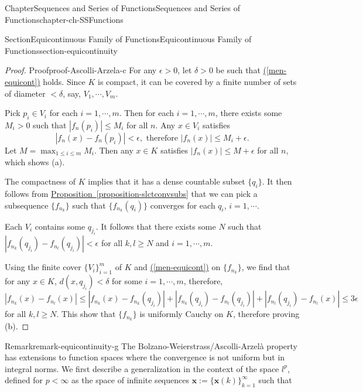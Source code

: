 \documentclass[oneside,10pt,]{book}
\newcommand{\xreffont}{\relax}
\numberwithin{equation}{section}
\begin{document}
\begin{chapterptx}{Chapter}{Sequences and Series of Functions}{}{Sequences and Series of Functions}{}{}{chapter-ch-SSFunctions}
\begin{sectionptx}{Section}{Equicontinuous Family of Functions}{}{Equicontinuous Family of Functions}{}{}{section-equicontinuity}
\begin{proof}{Proof}{}{proof-Ascolli-Arzela-c}
For any \(\epsilon > 0\), let \(\delta > 0\) be such that \hyperref[men-equicont]{({\xreffont\ref{men-equicont}})} holds. Since \(K\) is compact, it can be covered by a finite number of sets of diameter \(< \delta\), say, \(V_{1}, \cdots, V_{m}\).%
\par
Pick \(p_{i} \in V_{i}\) for each \(i=1,\cdots, m\). Then for each \(i=1,\cdots,m\), there exists some \(M_{i} > 0\) such that \(|f_{n}(p_{i})|\le M_{i}\) for all \(n\). Any \(x\in V_{i}\) satisfies%
\begin{equation*}
|f_{n}(x)-f_{n}(p_{i})| < \epsilon, \text{ therefore } |f_{n}(x)|\le M_{i}+\epsilon.
\end{equation*}
Let \(M=\max_{1\le i\le m}M_{i}\). Then any \(x\in K\) satisfies \(|f_{n}(x)|\le M+\epsilon\) for all \(n\), which shows (a).%
\par
The compactness of \(K\) implies that it has a dense countable subset \(\{q_{i}\}\). It then follows from \hyperref[proposition-slctconvsubs]{Proposition~{\xreffont\ref{proposition-slctconvsubs}}} that we can  pick a subsequence \(\{f_{n_{k}}\}\) such that \(\{f_{n_{k}}(q_{i})\}\) converges for each \(q_{i}\), \(i=1,\cdots\).%
\par
Each \(V_{i}\) contains some \(q_{j_{i}}\). It follows that there exists some \(N\) such  that \(|f_{n_{k}}(q_{j_i})-f_{n_{l}}(q_{j_i})| < \epsilon\) for all \(k, l\ge N\) and \(i=1,\cdots, m\).%
\par
Using the finite cover \(\{V_{i}\}_{i=1}^{m}\) of \(K\) and \hyperref[men-equicont]{({\xreffont\ref{men-equicont}})} on \(\{f_{n_{k}}\}\), we find that for any \(x\in K\), \(d(x, q_{j_i}) < \delta \) for some \(i=1,\cdots, m\), therefore,%
\begin{equation*}
|f_{n_{k}}(x)-f_{n_{l}}(x)|\le |f_{n_{k}}(x)-f_{n_{k}}(q_{j_i})|+| f_{n_{k}}(q_{j_i})-f_{n_{l}}(q_{j_i})|
+ |f_{n_{l}}(q_{j_i})-f_{n_{l}}(x)| \le 3\epsilon
\end{equation*}
for all \(k, l\ge N\).%
 This show that \(\{f_{n_{k}}\}\) is uniformly Cauchy on \(K\), therefore proving (b).\end{proof}
\begin{remark}{Remark}{}{remark-equicontinuity-g}%
The Bolzano-Weierstrass\slash{}Ascolli-Arzelà property has extensions to function spaces where the convergence is not uniform but in integral norms. We first describe a generalization  in the context of the space \(l^{p}\), defined for \(p < \infty\) as the space of infinite sequences \(\mathbf x:=\{\mathbf x(k)\}_{k=1}^{\infty}\) such that%
\begin{equation*}

\end{equation*}
\end{remark}
\end{sectionptx}
\end{chapterptx}
\end{document}
